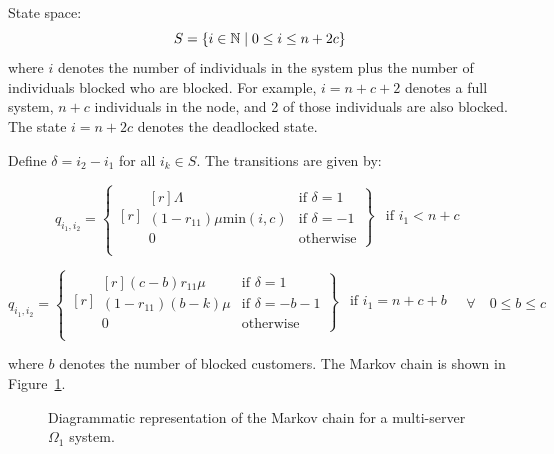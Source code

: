 \documentclass{article}
\numberwithin{equation}{section}
\begin{document}
State space:
        \[S = \{i\in\mathbb{N} \nonscript\; | \nonscript\; 0 \leq i \leq n + 2c\}\]
where \(i\) denotes the number of individuals in the system plus the number of individuals blocked who are blocked.
For example, $i=n+c+2$ denotes a full system, $n+c$ individuals in the node, and 2 of those individuals are also blocked.
The state $i=n+2c$ denotes the deadlocked state.

Define $\delta = i_2 - i_1$ for all $i_k \in S$. The transitions are given by:

\begin{equation}
  q_{i_1, i_2} = \left\{
  \begin{matrix*}[ r ]
    \left. \begin{matrix*}[ r ]
      \Lambda & \text{if } \delta = 1 \\
      (1-r_{11})\mu\text{min}(i, c) & \text{if } \delta = -1 \\
      0 & \text{otherwise}
    \end{matrix*} \right\} & \text{if } i_1 < n + c \\
  \end{matrix*} \right.
\end{equation}

\begin{equation}
  q_{i_1, i_2} = \left\{
  \begin{matrix*}[ r ]
    \left. \begin{matrix*}[ r ]
      (c-b)r_{11}\mu & \text{if } \delta = 1 \\
      (1-r_{11})(b-k)\mu & \text{if } \delta = -b-1\\
      0 & \text{otherwise}
    \end{matrix*} \right\} & \text{if } i_1 = n + c + b \\
  \end{matrix*} \right.
  \quad \forall \quad 0 \leq b \leq c
\end{equation}

where $b$ denotes the number of blocked customers.
The Markov chain is shown in Figure~\ref{fig:1nodeMCms}.

\begin{figure}[!htbp]
    \begin{center}
    
    \end{center}
    \caption{Diagrammatic representation of the Markov chain for a multi-server $\Omega_1$ system.}
    \label{fig:1nodeMCms}
\end{figure}
\end{document}
